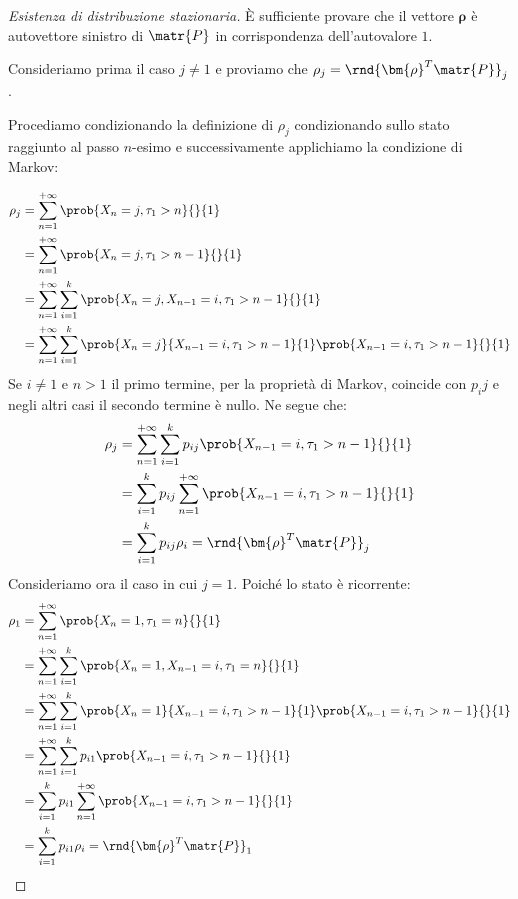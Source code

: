 \documentclass[\main/main.tex]{subfiles}
\begin{document}
\begin{proof}[Esistenza di distribuzione stazionaria]
  È sufficiente provare che il vettore \(\bm{\rho}\) è autovettore sinistro di \(\matr{P}\) in corrispondenza dell'autovalore \(1\).

  Consideriamo prima il caso \(j \neq 1\) e proviamo che \(\rho_j = \rnd{\bm{\rho}^T\matr{P}}_j\).

  Procediamo condizionando la definizione di \(\rho_j\) condizionando sullo stato raggiunto al passo \(n\)-esimo e successivamente applichiamo la condizione di Markov:

  \begin{align*}
    \rho_j & = \sum_{n=1}^{+\infty} \prob{X_n = j, \tau_1 > n}{}{1}                                                                \\
           & = \sum_{n=1}^{+\infty} \prob{X_n = j, \tau_1 > n-1}{}{1}                                                              \\
           & = \sum_{n=1}^{+\infty} \sum_{i=1}^k \prob{X_n = j, X_{n-1} = i, \tau_1 > n-1}{}{1}                                    \\
           & = \sum_{n=1}^{+\infty} \sum_{i=1}^k \prob{X_n = j}{X_{n-1} = i, \tau_1 > n-1}{1}\prob{X_{n-1} = i, \tau_1 > n-1}{}{1} \\
  \end{align*}
  Se \(i \neq 1\) e \(n> 1\) il primo termine, per la proprietà di Markov, coincide con \(p_ij\) e negli altri casi il secondo termine è nullo. Ne segue che:
  \begin{align*}
    \rho_j & = \sum_{n=1}^{+\infty} \sum_{i=1}^k p_{ij} \prob{X_{n-1} = i, \tau_1 > n-1}{}{1} \\
           & = \sum_{i=1}^k p_{ij} \sum_{n=1}^{+\infty} \prob{X_{n-1} = i, \tau_1 > n-1}{}{1} \\
           & = \sum_{i=1}^k p_{ij} \rho_i = \rnd{\bm{\rho}^T \matr{P}}_j
  \end{align*}
  Consideriamo ora il caso in cui \(j=1\). Poiché lo stato è ricorrente:
  \begin{align*}
    \rho_1 & = \sum_{n=1}^{+\infty} \prob{X_{n}= 1, \tau_1 = n}{}{1}                                                              \\
           & = \sum_{n=1}^{+\infty} \sum_{i=1}^k \prob{X_{n}= 1, X_{n-1}= i, \tau_1 = n}{}{1}                                     \\
           & = \sum_{n=1}^{+\infty} \sum_{i=1}^k \prob{X_{n}= 1}{X_{n-1}= i, \tau_1 > n-1}{1}\prob{X_{n-1}= i, \tau_1 > n-1}{}{1} \\
           & = \sum_{n=1}^{+\infty} \sum_{i=1}^k p_{i1}\prob{X_{n-1}= i, \tau_1 > n-1}{}{1}                                       \\
           & = \sum_{i=1}^k p_{i1} \sum_{n=1}^{+\infty} \prob{X_{n-1}= i, \tau_1 > n-1}{}{1}                                      \\
           & = \sum_{i=1}^k p_{i1} \rho_i =\rnd{\bm{\rho}^T \matr{P}}_1                                                           \\
  \end{align*}
\end{proof}
\clearpage
\end{document}
